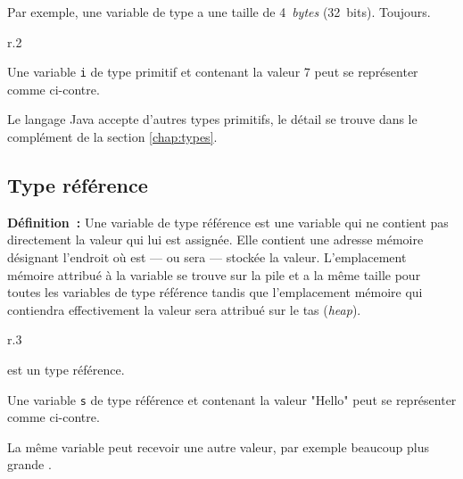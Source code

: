 	Par exemple, une variable de type  a une taille de
	4~\textit{bytes} (32~bits). Toujours.
	
	\begin{wrapfigure}{r}{.2\linewidth}
	\end{wrapfigure}

	Une variable \texttt{i} de type primitif et contenant la valeur 7 peut se
	représenter comme ci-contre. 

	Le langage Java accepte d'autres types primitifs, le détail se trouve dans le
	complément de la section \vref{chap:types}.
		

	\subsection{Type référence}
	\label{section:typereference}
	
	\textbf{Définition~:} 
	Une variable de type référence est une variable qui ne contient pas
	directement la valeur qui lui est assignée. Elle contient une adresse
	mémoire désignant l'endroit où est — ou sera — stockée la valeur.
	L'emplacement mémoire attribué à la variable se trouve sur la pile et a la
	même taille pour toutes les variables de type référence tandis que
	l'emplacement mémoire qui contiendra effectivement la valeur sera attribué
	sur le tas (\textit{heap}).


	\begin{wrapfigure}{r}{.3\linewidth}
		\begin{center}
		\end{center}
	\end{wrapfigure}
	
	 est un type référence. 

	Une variable \texttt{s} de type référence et contenant la valeur "Hello" 
	peut se représenter comme ci-contre. 

	La même variable  peut recevoir une autre valeur, par exemple beaucoup
	plus grande . 

